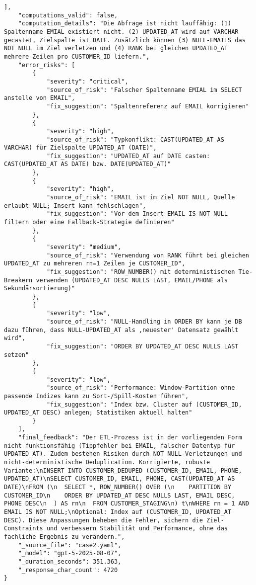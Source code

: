 \begin{lstlisting}[caption={Ausgabe: GPT-5 Anwendungsfall 2 Hauptdurchlauf},label={gpt_case2_prompt1}]
    ],
    "computations_valid": false,
    "computation_details": "Die Abfrage ist nicht lauffähig: (1) Spaltenname EMIAL existiert nicht. (2) UPDATED_AT wird auf VARCHAR gecastet, Zielspalte ist DATE. Zusätzlich können (3) NULL-EMAILS das NOT NULL im Ziel verletzen und (4) RANK bei gleichen UPDATED_AT mehrere Zeilen pro CUSTOMER_ID liefern.",
    "error_risks": [
        {
            "severity": "critical",
            "source_of_risk": "Falscher Spaltenname EMIAL im SELECT anstelle von EMAIL",
            "fix_suggestion": "Spaltenreferenz auf EMAIL korrigieren"
        },
        {
            "severity": "high",
            "source_of_risk": "Typkonflikt: CAST(UPDATED_AT AS VARCHAR) für Zielspalte UPDATED_AT (DATE)",
            "fix_suggestion": "UPDATED_AT auf DATE casten: CAST(UPDATED_AT AS DATE) bzw. DATE(UPDATED_AT)"
        },
        {
            "severity": "high",
            "source_of_risk": "EMAIL ist im Ziel NOT NULL, Quelle erlaubt NULL; Insert kann fehlschlagen",
            "fix_suggestion": "Vor dem Insert EMAIL IS NOT NULL filtern oder eine Fallback-Strategie definieren"
        },
        {
            "severity": "medium",
            "source_of_risk": "Verwendung von RANK führt bei gleichen UPDATED_AT zu mehreren rn=1 Zeilen je CUSTOMER_ID",
            "fix_suggestion": "ROW_NUMBER() mit deterministischen Tie-Breakern verwenden (UPDATED_AT DESC NULLS LAST, EMAIL/PHONE als Sekundärsortierung)"
        },
        {
            "severity": "low",
            "source_of_risk": "NULL-Handling in ORDER BY kann je DB dazu führen, dass NULL-UPDATED_AT als ,neuester' Datensatz gewählt wird",
            "fix_suggestion": "ORDER BY UPDATED_AT DESC NULLS LAST setzen"
        },
        {
            "severity": "low",
            "source_of_risk": "Performance: Window-Partition ohne passende Indizes kann zu Sort-/Spill-Kosten führen",
            "fix_suggestion": "Index bzw. Cluster auf (CUSTOMER_ID, UPDATED_AT DESC) anlegen; Statistiken aktuell halten"
        }
    ],
    "final_feedback": "Der ETL-Prozess ist in der vorliegenden Form nicht funktionsfähig (Tippfehler bei EMAIL, falscher Datentyp für UPDATED_AT). Zudem bestehen Risiken durch NOT NULL-Verletzungen und nicht-deterministische Deduplication. Korrigierte, robuste Variante:\nINSERT INTO CUSTOMER_DEDUPED (CUSTOMER_ID, EMAIL, PHONE, UPDATED_AT)\nSELECT CUSTOMER_ID, EMAIL, PHONE, CAST(UPDATED_AT AS DATE)\nFROM (\n  SELECT *, ROW_NUMBER() OVER (\n    PARTITION BY CUSTOMER_ID\n    ORDER BY UPDATED_AT DESC NULLS LAST, EMAIL DESC, PHONE DESC\n  ) AS rn\n  FROM CUSTOMER_STAGING\n) t\nWHERE rn = 1 AND EMAIL IS NOT NULL;\nOptional: Index auf (CUSTOMER_ID, UPDATED_AT DESC). Diese Anpassungen beheben die Fehler, sichern die Ziel-Constraints und verbessern Stabilität und Performance, ohne das fachliche Ergebnis zu verändern.",
    "_source_file": "case2.yaml",
    "_model": "gpt-5-2025-08-07",
    "_duration_seconds": 351.363,
    "_response_char_count": 4720
}
\end{lstlisting}


